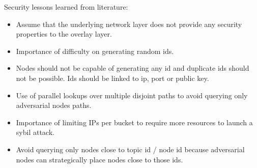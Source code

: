 



Security lessons learned from literature:
\begin{itemize}
\item Assume that the underlying network layer does not provide any security properties to the overlay layer.
\item Importance of difficulty on generating random ids.
\item Nodes should not be capable of generating any id and duplicate ids should not be possible.  Ids should be linked to ip,  port or public key.
\item  Use of  parallel lookups over multiple disjoint paths to avoid querying only  adversarial nodes paths.
\item Importance of limiting IPs per bucket to require more resources to launch a sybil attack.
\item Avoid querying only nodes close to topic id / node id because adversarial nodes can strategically place nodes close to those ids.
\end{itemize}

